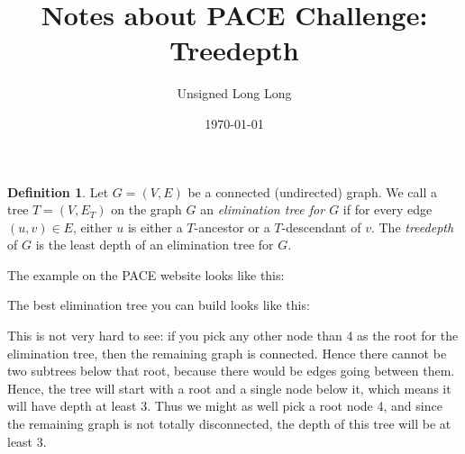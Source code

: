 \documentclass{article}
\title{Notes about PACE Challenge: Treedepth}
\author{Unsigned Long Long}
\date{\today}
\theoremstyle{definition}
\newtheorem{definition}{Definition}
\newcommand{\ed}[2]{\path[draw, thick] (#1) edge node {} (#2);}
\newcommand{\edl}[2]{\path[draw, thick] (#1) edge [bend left] node {} (#2);}
\newcommand{\edr}[2]{\path[draw, thick] (#1) edge [bend right] node {} (#2);}
\newcommand{\ted}[2]{\path[draw, line width=2pt] (#1) edge node {} (#2);}
\begin{document}
\maketitle
\begin{definition}
    Let $G = (V, E)$ be a connected (undirected) graph. We call a tree $T = (V, E_T)$ on the
    graph $G$ an \emph{elimination tree for $G$} if for every edge $(u, v) \in
    E$, either $u$ is either a $T$-ancestor or a $T$-descendant of $v$. The
    \emph{treedepth} of $G$ is the least depth of
    an elimination tree for $G$.
\end{definition}
The example on the PACE website looks like this:
\begin{center}
\end{center}
The best elimination tree you can build looks like this:
\begin{center}
\end{center}
This is not very hard to see: if you pick any other node than 4 as the root for
the elimination tree, then the remaining graph is connected. Hence there cannot
be two subtrees below that root, because there would be edges going between
them. Hence, the tree will start with a root and a single node below it, which
means it will have depth at least 3. Thus we might as well pick a root node 4,
and since the remaining graph is not totally disconnected, the depth of this
tree will be at least 3.
\end{document}

